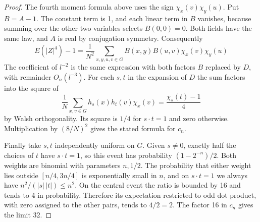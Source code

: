 \documentclass[11pt,a4paper]{article}
\theoremstyle{remark}
\begin{document}
\begin{proof}
The fourth moment formula above uses the sign $\chi_x(v)\chi_y(u)$. Put $B=A-1$. The constant term is 1, and each linear term in $B$ vanishes, because summing over the other two variables selects $B(0,0)=0$. Both fields have the same law, and $A$ is real by conjugation symmetry. Consequently
\[
 E(|Z|^4)-1=\frac1{N^2}\sum_{x,y,u,v\in G}
                  B(x,y)B(u,v)\chi_x(v)\chi_y(u)
\]
The coefficient of $l^{-2}$ is the same expression with both factors $B$ replaced by $D$, with remainder $O_n(l^{-3})$. For each $s,t$ in the expansion of $D$ the sum factors into the square of
\[
 \frac1N\sum_{x,v\in G}h_s(x)h_t(v)\chi_x(v)=\frac{\chi_s(t)-1}{4}
\]
by Walsh orthogonality. Its square is $1/4$ for $s\cdot t=1$ and zero otherwise. Multiplication by $(8/N)^2$ gives the stated formula for $c_n$.

Finally take $s,t$ independently uniform on $G$. Given $s\ne0$, exactly half the choices of $t$ have $s\cdot t=1$, so this event has probability $(1-2^{-n})/2$. Both weights are binomial with parameters $n,1/2$. The probability that either weight lies outside $[n/4,3n/4]$ is exponentially small in $n$, and on $s\cdot t=1$ we always have $n^2/(|s|\,|t|)\le n^2$. On the central event the ratio is bounded by 16 and tends to 4 in probability. Therefore its expectation restricted to odd dot product, with zero assigned to the other pairs, tends to $4/2=2$. The factor 16 in $c_n$ gives the limit 32.
\end{proof}
\end{document}
